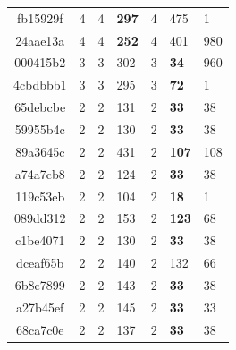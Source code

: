 \begin{table}
\begin{tabular}{c | r | r l | r l | t }
        
        fb15929f &                  4 &            4    &  \textbf{297} & 4 & 475 & 1 \\ 
        24aae13a &                  4 &         4       &  \textbf{252 } & 4 & 401 & 980\\ 
        000415b2 &                  3 &         3       &  302 & 3 & \textbf{34} & 960 \\
        
        4cbdbbb1 &                  3 &          3      &  295 & 3 & \textbf{72} & 1\\ 
        65debcbe &                  2 &          2      &  131  & 2 & \textbf{33} & 38 \\ 
        59955b4c &                  2 &          2      &  130  & 2 & \textbf{33} & 38 \\
        
        
        89a3645c &                  2 &           2     &  431 & 2 & \textbf{107} & 108\\
        a74a7cb8 &                  2 &           2     &  124 & 2 & \textbf{33} & 38 \\
        119c53eb &                  2 &           2     &  104 & 2 & \textbf{18} & 1 \\
        
        089dd312 &                  2 &           2     &  153 & 2 & \textbf{123} & 68\\
        c1be4071 &                  2 &           2     &  130 & 2 & \textbf{33} & 38\\
        dceaf65b &                  2 &           2     &  140 & 2 & 132 & 66\\
        
        6b8c7899 &                  2 &            2    &  143 & 2 & \textbf{33} & 38 \\
        a27b45ef &                  2 &         2       &  145 & 2 & \textbf{33} & 33\\
        68ca7c0e &                  2 &         2       &  137  & 2 & \textbf{33} & 38\\
        

\end{tabular}
\end{table}
